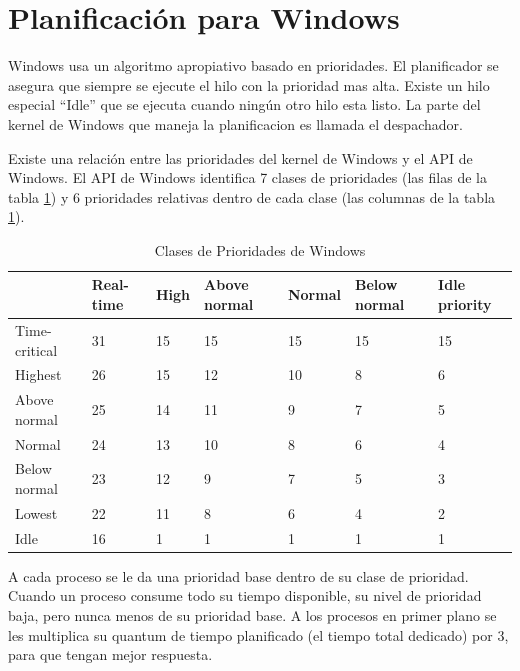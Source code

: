 \documentclass{article}
\begin{document}
\section*{Planificación para Windows}

Windows usa un algoritmo apropiativo basado en prioridades.
El planificador se asegura que siempre se ejecute el hilo con la prioridad mas alta.
Existe un hilo especial ``Idle'' que se ejecuta cuando ningún otro hilo esta listo.
La parte del kernel de Windows que maneja la planificacion es llamada el despachador.

Existe una relación entre las prioridades del kernel de Windows y el API de Windows.
El API de Windows identifica 7 clases de prioridades (las filas de la tabla \ref{table:windows1})
y 6 prioridades relativas dentro de cada clase (las columnas de la tabla \ref{table:windows1}).
\begin{table}[h]
	\centering
	\begin{tabular}{l|l|l|l|l|l|l|}
		\cline{2-7}
		& Real-time & High & Above normal & Normal & Below normal & Idle priority \\ \hline
		\multicolumn{1}{|l|}{Time-critical} & 31        & 15   & 15           & 15     & 15           & 15            \\ \hline
		\multicolumn{1}{|l|}{Highest}       & 26        & 15   & 12           & 10     & 8            & 6             \\ \hline
		\multicolumn{1}{|l|}{Above normal}  & 25        & 14   & 11           & 9      & 7            & 5             \\ \hline
		\multicolumn{1}{|l|}{Normal}        & 24        & 13   & 10           & 8      & 6            & 4             \\ \hline
		\multicolumn{1}{|l|}{Below normal}  & 23        & 12   & 9            & 7      & 5            & 3             \\ \hline
		\multicolumn{1}{|l|}{Lowest}        & 22        & 11   & 8            & 6      & 4            & 2             \\ \hline
		\multicolumn{1}{|l|}{Idle}          & 16        & 1    & 1            & 1      & 1            & 1             \\ \hline
	\end{tabular}
		\caption{Clases de Prioridades de Windows}
		\label{table:windows1}
\end{table}

A cada proceso se le da una prioridad base dentro de su clase de prioridad. Cuando un proceso consume 
todo su tiempo disponible, su nivel de prioridad baja, pero nunca menos de su prioridad base.
A los procesos en primer plano se les multiplica su quantum de tiempo planificado (el tiempo total dedicado)
por 3, para que tengan mejor respuesta.
\newpage
\end{document}
